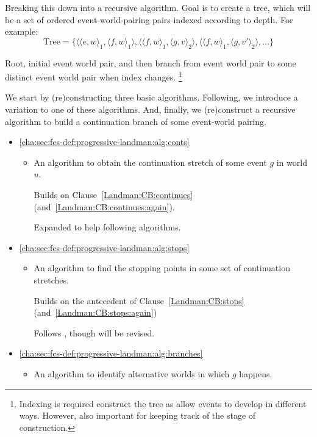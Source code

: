 \begin{note}
  Breaking this down into a recursive algorithm.
  Goal is to create a tree, which will be a set of ordered event-world-pairing pairs indexed according to depth.
  For example:
  \[\text{Tree} = \{\langle \langle e,w \rangle_{1}, \langle f,w \rangle_{1} \rangle, \langle \langle f,w \rangle_{1}, \langle g,v \rangle_{2} \rangle, \langle \langle f,w \rangle_{1}, \langle g,v' \rangle_{2} \rangle, \dots \}\]

  Root, initial event world pair, and then branch from event world pair to some distinct event world pair when index changes.
  \footnote{
    Indexing is required construct the tree as allow events to develop in different ways.
    However, also important for keeping track of the stage of construction.
  }

  We start by (re)constructing three basic algorithms.
  Following, we introduce a variation to one of these algorithms.
  And, finally, we (re)construct a recursive algorithm to build a continuation branch of some event-world pairing.

  \begin{itemize}[noitemsep]
  \item
    \hfill%
    \autoref{cha:sec:fcs-def:progressive-landman:alg:conts}
    \begin{itemize}
    \item
      An algorithm to obtain the continuation stretch of some event \(g\) in world \(u\).

      Builds on Clause~\ref{Landman:CB:continues} (and~\ref{Landman:CB:continues:again}).

      Expanded to help following algorithms.
    \end{itemize}
  \item
    \hfill%
    \autoref{cha:sec:fcs-def:progressive-landman:alg:stops}
    \begin{itemize}
    \item
      An algorithm to find the stopping points in some set of continuation stretches.

      Builds on the antecedent of Clause~\ref{Landman:CB:stops} (and~\ref{Landman:CB:stops:again})

      Follows \citeauthor{Landman:1992wh}, though will be revised.
    \end{itemize}
  \item
    \hfill%
    \autoref{cha:sec:fcs-def:progressive-landman:alg:branches}
    \begin{itemize}
    \item
      An algorithm to identify alternative worlds in which \(g\) happens.


\end{itemize}
\end{itemize}
\end{note}
